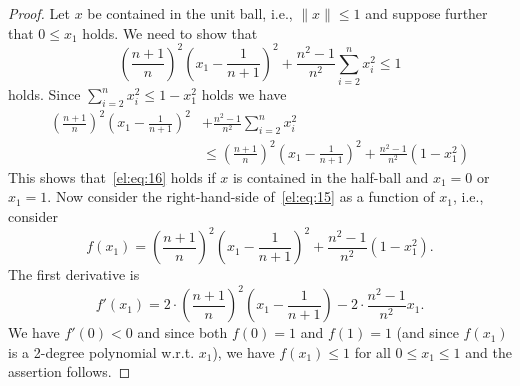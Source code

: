 \begin{proof} 
  Let $x$ be contained in the unit ball, i.e., $\|x\|\leq1$ and suppose
  further that $0\leq x_1$ holds.  We need to show that 
  \begin{equation}
    \label{el:eq:16}
    \left(\frac{n+1}{n}\right)^2  \left( x_1 -
      \frac{1}{n+1}\right)^2 + \frac{n^2-1}{n^2} \sum_{i=2}^n x_i^2 \leq1 
  \end{equation}
  holds. 
  Since $\sum_{i=2}^nx_i^2\leq1 - x_1^2$ holds we have 
  \begin{equation}
    \label{el:eq:15}
    \begin{split}      
    \left(\frac{n+1}{n}\right)^2  \left( x_1 -
      \frac{1}{n+1}\right)^2 & + \frac{n^2-1}{n^2} \sum_{i=2}^n x_i^2 \\    
                            & \leq     \left(\frac{n+1}{n}\right)^2  \left( x_1 -
      \frac{1}{n+1}\right)^2 + \frac{n^2-1}{n^2} (1-x_1^2)     
  \end{split}
\end{equation}
This shows that~\eqref{el:eq:16} holds if $x$ is contained in the
half-ball and $x_1=0$ or $x_1=1$. Now consider the right-hand-side
of~\eqref{el:eq:15} as a function of $x_1$, i.e., consider 
\begin{equation}
  \label{el:eq:17}
  f(x_1) = \left(\frac{n+1}{n}\right)^2  \left( x_1 -
    \frac{1}{n+1}\right)^2 + \frac{n^2-1}{n^2} (1-x_1^2).    
\end{equation}
The first derivative is 
\begin{equation}
\label{el:eq:18}
  f'(x_1) = 2\cdot \left(\frac{n+1}{n}\right)^2  \left( x_1 -
    \frac{1}{n+1}\right) -  2\cdot \frac{n^2-1}{n^2} x_1.    
\end{equation}
We have $f'(0)<0$ and since both $f(0)=1$ and $f(1)=1$ (and since 
$f(x_1)$ is a 2-degree polynomial w.r.t. $x_1$),  we have
$f(x_1)\leq1$ for all $0\leq x_1\leq1$ and the assertion follows. 
\end{proof}



